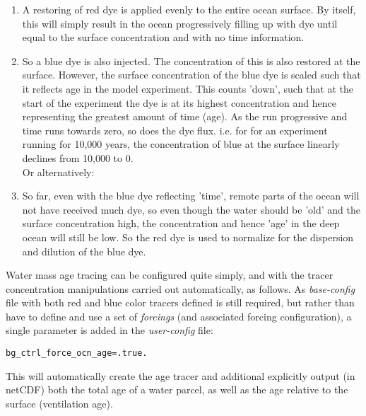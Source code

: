 \documentclass[11pt,fleqn]{book} %
\begin{document}
\begin{enumerate}
\setlength{\itemindent}{.2in}

\vspace{1mm}
\item A restoring of red dye is applied evenly to the entire ocean surface. By itself, this will simply result in the ocean progressively filling up with dye until equal to the surface concentration and with no time information.

\vspace{1mm}
\item So a blue dye is also injected. The concentration of this is also restored at the surface. However, the surface concentration of the blue dye is scaled such that it reflects age in the model experiment. This counts 'down', such that at the start of the experiment the dye is at its highest concentration and hence representing the greatest amount of time (age). As the run progressive and time runs towards zero, so does the dye flux. i.e. for for an experiment running for 10,000 years, the concentration of blue at the surface linearly declines from 10,000 to 0.
\\Or alternatively:

\vspace{1mm}
\item So far, even with the blue dye reflecting 'time', remote parts of the ocean will not have received much dye, so even though the water should be 'old' and the surface concentration high, the concentration and hence 'age' in the deep ocean will still be low. So the red dye is used to normalize for the dispersion and dilution of the blue dye.

\end{enumerate}
\vspace{2mm}

Water mass age tracing can be configured quite simply, and with the tracer concentration manipulations carried out automatically, as follows. As \textit{base-config} file with both red and blue color tracers defined is still required, but  rather than have to define and use a set of \textit{forcings} (and associated forcing configuration), a single parameter is added in the \textit{user-config} file:
\vspace{-2pt}\begin{verbatim}
bg_ctrl_force_ocn_age=.true.
\end{verbatim}\vspace{-2pt}
This will automatically create the age tracer and additional explicitly output (in netCDF) both the total age of a water parcel, as well as the age relative to the surface (ventilation age).
\end{document}

